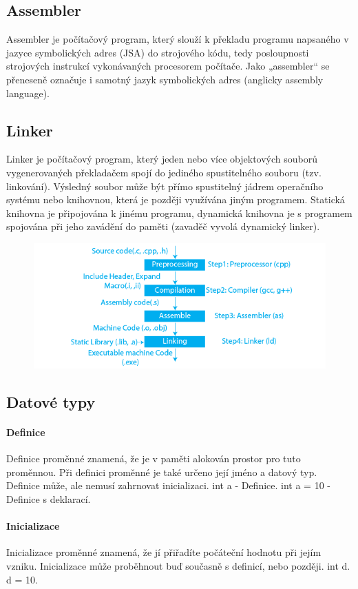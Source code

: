 \subsection{Assembler}
Assembler je počítačový program, který slouží k překladu programu napsaného v jazyce symbolických adres (JSA) do strojového kódu, tedy posloupnosti strojových instrukcí vykonávaných procesorem počítače. Jako „assembler“ se přeneseně označuje i samotný jazyk symbolických adres (anglicky assembly language).

\subsection{Linker}
Linker je počítačový program, který jeden nebo více objektových souborů vygenerovaných překladačem spojí do jediného spustitelného souboru (tzv. linkování). Výsledný soubor může být přímo spustitelný jádrem operačního systému nebo knihovnou, která je později využívána jiným programem. Statická knihovna je připojována k jinému programu, dynamická knihovna je s programem spojována při jeho zavádění do paměti (zavaděč vyvolá dynamický linker).

\begin{figure}[htbp]
\centering
\includegraphics[scale=0.5]{sections/1_jazyk_c/images/1679577255149-1-02 (15).png}
\end{figure}
\subsection{Datové typy}
\paragraph{Definice}
Definice proměnné znamená, že je v paměti alokován prostor pro tuto proměnnou. Při definici proměnné je také určeno její jméno a datový typ. Definice může, ale nemusí zahrnovat inicializaci.
int a - Definice.
int a = 10 - Definice s deklarací.
\paragraph{Inicializace}
Inicializace proměnné znamená, že jí přiřadíte počáteční hodnotu při jejím vzniku. Inicializace může proběhnout buď současně s definicí, nebo později. int d. d = 10.
